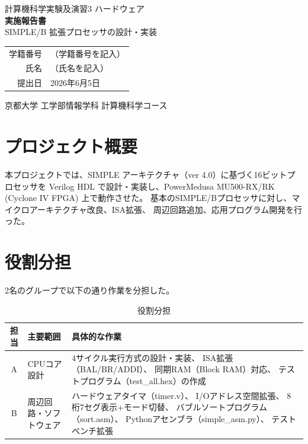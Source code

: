 \documentclass[a4paper,11pt]{ltjsarticle}
\begin{document}
\begin{titlepage}
\centering
\vspace*{3cm}
{\LARGE 計算機科学実験及演習3 ハードウェア}\\[1cm]
{\Huge\bfseries 実施報告書}\\[0.5cm]
{\LARGE SIMPLE/B 拡張プロセッサの設計・実装}\\[3cm]
\begin{tabular}{rl}
学籍番号 & （学籍番号を記入） \\[0.5em]
氏名     & （氏名を記入） \\[0.5em]
提出日   & 2026年6月5日 \\
\end{tabular}
\vfill
京都大学 工学部情報学科 計算機科学コース
\end{titlepage}

\tableofcontents
\clearpage


\section{プロジェクト概要}

本プロジェクトでは、SIMPLE アーキテクチャ（ver 4.0）に基づく16ビットプロセッサを
Verilog HDL で設計・実装し、PowerMedusa MU500-RX/RK (Cyclone IV FPGA) 上で動作させた。
基本のSIMPLE/Bプロセッサに対し、マイクロアーキテクチャ改良、ISA拡張、
周辺回路追加、応用プログラム開発を行った。


\section{役割分担}

2名のグループで以下の通り作業を分担した。

\begin{table}[h]
\centering
\caption{役割分担}
\begin{tabular}{clp{8cm}}
\toprule
担当 & 主要範囲 & 具体的な作業 \\
\midrule
A & CPUコア設計 &
  4サイクル実行方式の設計・実装、
  ISA拡張（BAL/BR/ADDI）、
  同期RAM（Block RAM）対応、
  テストプログラム（test\_all.hex）の作成 \\
\midrule
B & 周辺回路・ソフトウェア &
  ハードウェアタイマ（timer.v）、
  I/Oアドレス空間拡張、
  8桁7セグ表示+モード切替、
  バブルソートプログラム（sort.asm）、
  Pythonアセンブラ（simple\_asm.py）、
  テストベンチ拡張 \\
\bottomrule
\end{tabular}
\end{table}
\end{document}

